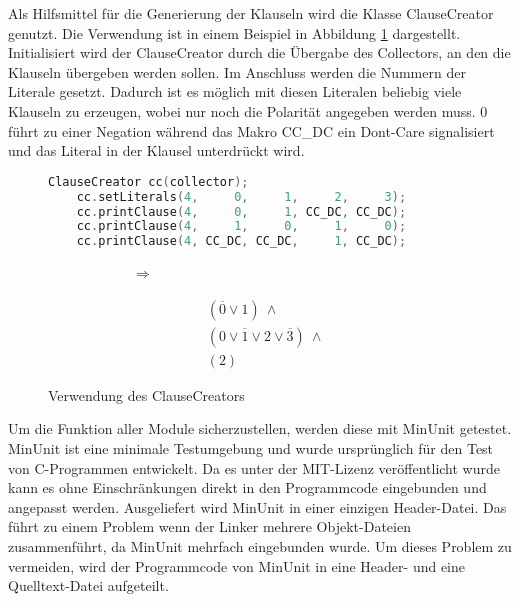 Als Hilfsmittel für die Generierung der Klauseln wird die Klasse ClauseCreator genutzt. Die Verwendung ist in einem Beispiel in Abbildung \ref{fig:clausecreator} dargestellt.
Initialisiert wird der ClauseCreator durch die Übergabe des Collectors, an den die Klauseln übergeben werden sollen. Im Anschluss werden die Nummern der Literale gesetzt.
Dadurch ist es möglich mit diesen Literalen beliebig viele Klauseln zu erzeugen, wobei nur noch die Polarität angegeben werden muss. 0 führt zu einer Negation während
das Makro CC\_DC ein Dont-Care signalisiert und das Literal in der Klausel unterdrückt wird.
\begin{figure}[!h]
  \centering
  \begin{minipage}[c]{7.5cm}
    \begin{lstlisting}[language=c]
	ClauseCreator cc(collector);
	cc.setLiterals(4,     0,     1,     2,     3);
	cc.printClause(4,     0,     1, CC_DC, CC_DC);
	cc.printClause(4,     1,     0,     1,     0);
	cc.printClause(4, CC_DC, CC_DC,     1, CC_DC);
    \end{lstlisting}
  \end{minipage}
  \begin{minipage}[c]{2cm}
    ~~~~~~~~~~~~$ \Rightarrow $   
  \end{minipage}
  \begin{minipage}[c]{2cm}
    \begin{align*}
      & (\overline{0} \vee 1) ~ \wedge \\
      & (0 \vee \overline{1} \vee 2 \vee \overline{3}) ~ \wedge \\
      & (2) \nonumber
    \end{align*}
  \end{minipage}
  \caption{Verwendung des ClauseCreators}
  \label{fig:clausecreator}
\end{figure}

Um die Funktion aller Module sicherzustellen, werden diese mit MinUnit \cite{minunit} getestet. MinUnit ist eine minimale Testumgebung und
wurde ursprünglich für den Test von C-Programmen entwickelt. Da es unter der MIT-Lizenz veröffentlicht wurde kann es ohne Einschränkungen
direkt in den Programmcode eingebunden und angepasst werden. Ausgeliefert wird MinUnit in einer einzigen Header-Datei. Das führt zu einem
Problem wenn der Linker mehrere Objekt-Dateien zusammenführt, da MinUnit mehrfach eingebunden wurde. Um dieses Problem zu vermeiden, wird
der Programmcode von MinUnit in eine Header- und eine Quelltext-Datei aufgeteilt.

